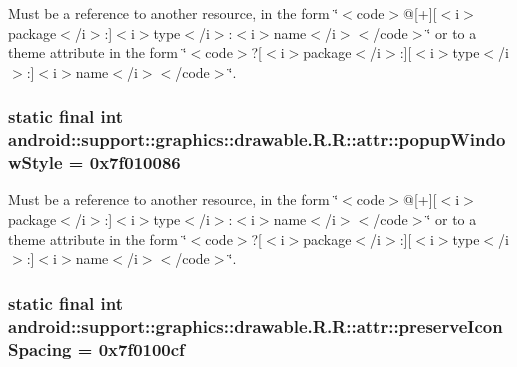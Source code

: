 Must be a reference to another resource, in the form \char`\"{}$<$code$>$@\mbox{[}+\mbox{]}\mbox{[}$<$i$>$package$<$/i$>$:\mbox{]}$<$i$>$type$<$/i$>$:$<$i$>$name$<$/i$>$$<$/code$>$\char`\"{} or to a theme attribute in the form \char`\"{}$<$code$>$?\mbox{[}$<$i$>$package$<$/i$>$:\mbox{]}\mbox{[}$<$i$>$type$<$/i$>$:\mbox{]}$<$i$>$name$<$/i$>$$<$/code$>$\char`\"{}. \hypertarget{classandroid_1_1support_1_1graphics_1_1drawable_1_1_r_1_1attr_ab8bbb72747706bd3db565003ffa925e}{
\subsubsection[{popupWindowStyle}]{\setlength{\rightskip}{0pt plus 5cm}static final int android::support::graphics::drawable.R.R::attr::popupWindowStyle = 0x7f010086}}
\label{classandroid_1_1support_1_1graphics_1_1drawable_1_1_r_1_1attr_ab8bbb72747706bd3db565003ffa925e}


Must be a reference to another resource, in the form \char`\"{}$<$code$>$@\mbox{[}+\mbox{]}\mbox{[}$<$i$>$package$<$/i$>$:\mbox{]}$<$i$>$type$<$/i$>$:$<$i$>$name$<$/i$>$$<$/code$>$\char`\"{} or to a theme attribute in the form \char`\"{}$<$code$>$?\mbox{[}$<$i$>$package$<$/i$>$:\mbox{]}\mbox{[}$<$i$>$type$<$/i$>$:\mbox{]}$<$i$>$name$<$/i$>$$<$/code$>$\char`\"{}. \hypertarget{classandroid_1_1support_1_1graphics_1_1drawable_1_1_r_1_1attr_682b521da50ec8e9ebaf1f9c98a16b8d}{
\subsubsection[{preserveIconSpacing}]{\setlength{\rightskip}{0pt plus 5cm}static final int android::support::graphics::drawable.R.R::attr::preserveIconSpacing = 0x7f0100cf}}
\label{classandroid_1_1support_1_1graphics_1_1drawable_1_1_r_1_1attr_682b521da50ec8e9ebaf1f9c98a16b8d}


